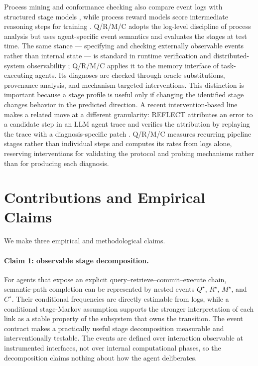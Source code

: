 \documentclass[letterpaper]{article} %
\begin{document}
Process mining and conformance checking also compare event logs with structured stage models \citep{vanderaalst2016process,carmona2018conformance}, while process reward models score intermediate reasoning steps for training \citep{lightman2024verify}. Q/R/M/C adopts the log-level discipline of process analysis but uses agent-specific event semantics and evaluates the stages at test time. The same stance --- specifying and checking externally observable events rather than internal state --- is standard in runtime verification and distributed-system observability \citep{leucker2009runtime}; Q/R/M/C applies it to the memory interface of task-executing agents. Its diagnoses are checked through oracle substitutions, provenance analysis, and mechanism-targeted interventions. This distinction is important because a stage profile is useful only if changing the identified stage changes behavior in the predicted direction. A recent intervention-based line makes a related move at a different granularity: REFLECT attributes an error to a candidate step in an LLM agent trace and verifies the attribution by replaying the trace with a diagnosis-specific patch \citep{lin2026reflect}. Q/R/M/C measures recurring pipeline stages rather than individual steps and computes its rates from logs alone, reserving interventions for validating the protocol and probing mechanisms rather than for producing each diagnosis.

\section{Contributions and Empirical Claims}
\label{sec:claims}

We make three empirical and methodological claims.

\paragraph{Claim 1: observable stage decomposition.}
For agents that expose an explicit query--retrieve--commit--execute chain, semantic-path completion can be represented by nested events $Q^\star$, $R^\star$, $M^\star$, and $C^\star$. Their conditional frequencies are directly estimable from logs, while a conditional stage-Markov assumption supports the stronger interpretation of each link as a stable property of the subsystem that owns the transition. The event contract makes a practically useful stage decomposition measurable and interventionally testable. The events are defined over interaction observable at instrumented interfaces, not over internal computational phases, so the decomposition claims nothing about how the agent deliberates.
\end{document}

